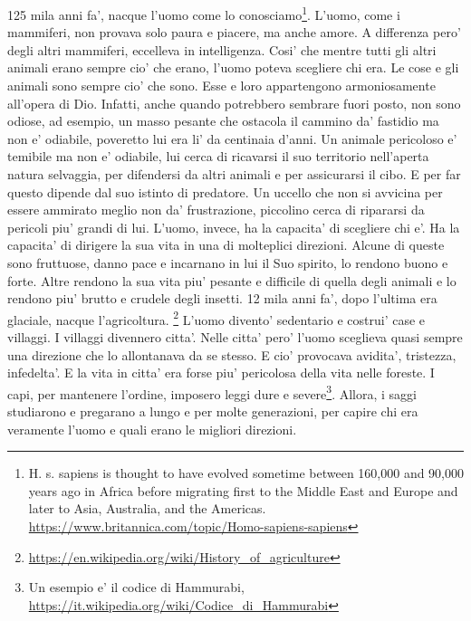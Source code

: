 {125 mila anni fa', nacque l'uomo come lo conosciamo\footnote{H. s. sapiens is thought to have evolved sometime between 160,000 and 90,000 years ago in Africa before migrating first to the Middle East and Europe and later to Asia, Australia, and the Americas. \url{https://www.britannica.com/topic/Homo-sapiens-sapiens}}. L'uomo, come i mammiferi, non provava solo paura e piacere, ma anche amore. A differenza pero' degli altri mammiferi, eccelleva in intelligenza. Cosi' che mentre tutti gli altri animali erano sempre cio' che erano, l'uomo poteva scegliere chi era. Le cose e gli animali sono sempre cio' che sono. Esse e loro appartengono armoniosamente  all'opera di Dio. Infatti, anche quando potrebbero sembrare fuori posto, non sono odiose, ad esempio, un masso pesante che ostacola il cammino da' fastidio ma non e' odiabile, poveretto lui era li' da centinaia d'anni. Un animale pericoloso e' temibile ma non e' odiabile, lui cerca di ricavarsi il suo territorio nell'aperta natura selvaggia, per difendersi da altri animali e per assicurarsi il cibo. E per far questo dipende dal suo istinto di predatore. Un uccello che non si avvicina per essere ammirato meglio non da' frustrazione, piccolino cerca di ripararsi da pericoli piu' grandi di lui.
  L'uomo, invece, ha la capacita' di scegliere chi e'. Ha la capacita' di dirigere la sua vita in una di molteplici direzioni. Alcune di queste sono fruttuose, danno pace e incarnano in lui il Suo spirito, lo rendono buono e forte. Altre rendono la sua vita piu' pesante e difficile di quella degli animali e lo rendono piu' brutto e crudele degli insetti.
  12 mila anni fa', dopo l'ultima era glaciale, nacque l'agricoltura. \footnote{\url{https://en.wikipedia.org/wiki/History\_of\_agriculture}} L'uomo divento' sedentario e costrui' case e villaggi. I villaggi divennero citta'. Nelle citta' pero' l'uomo sceglieva quasi sempre una direzione che lo allontanava da se stesso. E cio' provocava avidita', tristezza, infedelta'. E la vita in citta' era forse piu' pericolosa della vita nelle foreste.
  I capi, per mantenere l'ordine, imposero leggi dure e severe\footnote{Un esempio e' il codice di Hammurabi, \url{https://it.wikipedia.org/wiki/Codice\_di\_Hammurabi}}. Allora, i saggi studiarono e pregarano a lungo e per molte generazioni, per capire chi era veramente l'uomo e quali erano le migliori direzioni. 
}

